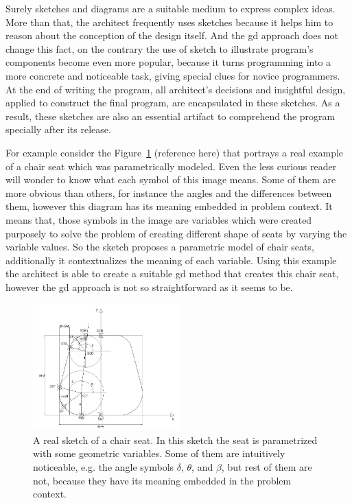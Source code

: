 Surely sketches and diagrams are a suitable medium to express complex ideas. More than that, the architect frequently uses sketches because it helps him to reason about the conception of the design itself. And the \gls{gd} approach does not change this fact, on the contrary the use of sketch to illustrate program's components become even more popular, because it turns programming into a more  concrete and noticeable task, giving special clues for novice programmers. At the end of writing the program, all architect's decisions and insightful design, applied to construct the final program, are encapsulated in these sketches. As a result, these
sketches are also an essential artifact to comprehend the program specially after its release. 

For example consider the Figure~\ref{fig:chairseat} (reference here) that portrays a real example of a chair seat which was parametrically modeled. Even the less curious reader will wonder to know what each symbol of this image means. Some of them are more obvious than others, for instance the angles and the differences between them, however this diagram has its meaning embedded in problem context. It means that, those symbols in the image are variables which were created purposely to solve the problem of creating different shape of seats by varying the variable values. So the sketch proposes a parametric model of chair seats, additionally it contextualizes the meaning of each variable. Using this example the architect is able to create a suitable \gls{gd} method that creates this chair seat, however the \gls{gd} approach is not so straightforward as it seems to be. 

\begin{figure}[!htbp]
  \centering
  \includegraphics[width=0.5\textwidth]{images/seat}
    \caption{A real sketch of a chair seat. In this sketch the seat is parametrized with some geometric variables. Some of them are intuitively noticeable, e.g. the angle symbols $\delta$, $\theta$, and $\beta$, but rest of them are not, because they have its meaning embedded in the problem context.}
  \label{fig:chairseat}
\end{figure}

